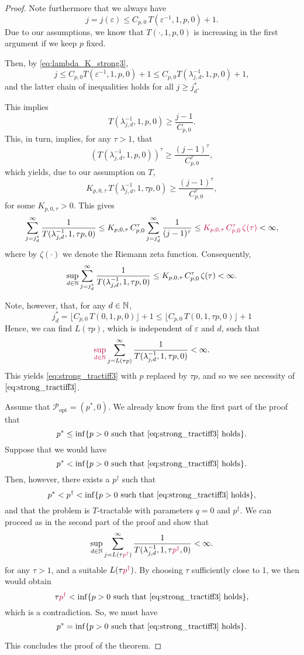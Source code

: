 \documentclass[11pt,a4paper]{article}
\newcommand{\peter}[1]{\begingroup\color{purple}#1\endgroup}
\begin{document}
\begin{proof}
Note furthermore that we always have
\[
j=j(\varepsilon)\le C_{p,0}\, T(\varepsilon^{-1},1,p,0)+1.
\]
Due to our assumptions, we know that
$T(\cdot,1, p,0)$ is increasing in the first argument if
we keep $p$ fixed.

Then, by \eqref{eq:lambda_K_strong3},
\[
j \le C_{p,0} T(\varepsilon^{-1},1,p,0)+1\le C_{p,0} T(\lambda_{j,d}^{-1},1,p,0)+1,
\]
and the latter chain of inequalities holds for all $j\ge j_d^*$.


This implies
\[
 T(\lambda_{j,d}^{-1},1, p,0) \ge \frac{j-1}{C_{p,0}}.
\]
This, in turn, implies, for any $\tau>1$, that
\[
 (T(\lambda_{j,d}^{-1},1, p,0))^\tau \ge \frac{(j-1)^\tau}{C_{p,0}^\tau },
\]
which yields, due to our assumption on $T$,
\[
 K_{p,0,\tau}\,T (\lambda_{j,d}^{-1},1,\tau p,0) \ge \frac{(j-1)^\tau}{C_{p,0}^\tau},
\]
for some $K_{p,0,\tau}>0$.
This gives
\[
\sum_{j=j_d^*}^\infty \frac{1}{T (\lambda_{j,d}^{-1},1, \tau p,0)} \le K_{p,0,\tau}\, C_{p,0}^\tau
\sum_{j=j_d^*}^\infty \frac{1}{(j-1)^\tau} \le
\peter{K_{p,0,\tau}\, C_{p,0}^\tau\, \zeta (\tau) }< \infty,
\]
\peter{where by $\zeta(\cdot)$ we denote the Riemann zeta function. Consequently,
\[
\sup_{d\in\mathbb{N}} \sum_{j=j_d^*}^\infty \frac{1}{T (\lambda_{j,d}^{-1},1, \tau p,0)} \le K_{p,0,\tau}\, C_{p,0}^\tau\, \zeta (\tau) < \infty.
\]
}


Note, however, that, \peter{for any $d\in\mathbb{N}$,}
\[
 j_d^* = \lfloor C_{p,0}\, T(0,1,p,0)\rfloor +1 \le \lfloor C_{p,0}\, T(0,1,\tau p,0)\rfloor +1
\]
Hence, we can find $L(\tau p)$, which is independent of $\varepsilon$ and $d$, such that
\[
 \peter{\sup_{d\in\naturals}} \sum_{j=L(\tau p)}^\infty \frac{1}{T(\lambda_{j,d}^{-1},1, \tau p,0)}<\infty.
\]
This yields \eqref{eq:strong_tractiff3} with $p$ replaced by $\tau p$, and so we see necessity of $\eqref{eq:strong_tractiff3}$.


Assume that $\mathcal{P}_{\text{opt}}=(p^*,0)$. We already know from the first part of the proof that
\[
 p^* \le \inf\{p>0\ \mbox{such that \eqref{eq:strong_tractiff3} holds}\}.
\]
Suppose that we would have
\[
 p^* < \inf\{p>0\ \mbox{such that \eqref{eq:strong_tractiff3} holds}\}.
\]
\peter{Then, however, there exists a $p^\dag$ such that
\[
p^* < p^\dag < \inf\{p>0\ \mbox{such that \eqref{eq:strong_tractiff3} holds}\},
\]
and that the problem is $T$-tractable with parameters $q=0$ and $p^\dag$. }
We can proceed as in the second part of the proof and show that
\[
 \sup_{d\in\naturals} \sum_{j=L(\tau \peter{p^\dag})}^\infty \frac{1}{T(\lambda_{j,d}^{-1},1, \tau \peter{p^\dag},0)}<\infty.
\]
for any $\tau>1$, and a suitable $L(\tau \peter{p^\dag})$. By choosing $\tau$ sufficiently close to 1, we then would
obtain
\[
 \tau \peter{p^\dag} < \inf\{p>0\ \mbox{such that \eqref{eq:strong_tractiff3} holds}\},
\]
which is a contradiction. So, we must have
\[
 p^* = \inf\{p>0\ \mbox{such that \eqref{eq:strong_tractiff3} holds}\}.
\]

This concludes the proof of the theorem.

\end{proof}
\bigskip
\end{document}
